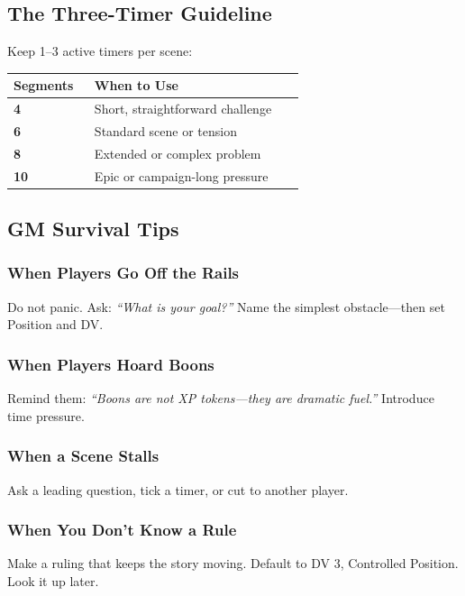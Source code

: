 \documentclass[10pt,twocolumn]{article} %
\begin{document}
\subsection{The Three-Timer Guideline}
Keep 1--3 active timers per scene:
\begin{coretable}
\begin{tabular}{>{\bfseries}p{0.25\linewidth} p{0.65\linewidth}}
\toprule
\textbf{Segments} & \textbf{When to Use} \\
\midrule
4 & Short, straightforward challenge \\
6 & Standard scene or tension \\
8 & Extended or complex problem \\
10 & Epic or campaign-long pressure \\
\bottomrule
\end{tabular}
\end{coretable}

\subsection{GM Survival Tips}
\subsubsection{When Players Go Off the Rails}
Do not panic. Ask: \textit{``What is your goal?''} Name the simplest obstacle---then set Position and DV.

\subsubsection{When Players Hoard Boons}
Remind them: \textit{``Boons are not XP tokens---they are dramatic fuel.''} Introduce time pressure.

\subsubsection{When a Scene Stalls}
Ask a leading question, tick a timer, or cut to another player.

\subsubsection{When You Don't Know a Rule}
Make a ruling that keeps the story moving. Default to DV 3, Controlled Position. Look it up later.

\end{document}
